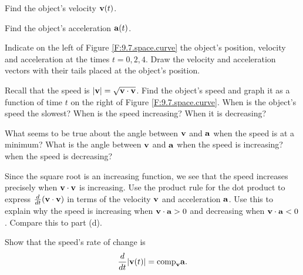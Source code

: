 \begin{activity}
\ba
\item Find the object's velocity $\mathbf{v}(t)$.

\item Find the object's acceleration $\mathbf{a}(t)$.

\item Indicate on the left of Figure \ref{F:9.7.space.curve} the object's
  position, velocity and acceleration at the times $t=0, 2, 4$.  Draw
  the velocity and acceleration vectors with their tails placed at the
  object's position.

\item Recall that the speed is $|\mathbf{v}| = \sqrt{\mathbf{v}\cdot\mathbf{v}}$. Find the object's speed and graph it as a function of time $t$ on the right of Figure \ref{F:9.7.space.curve}.  When is the
  object's speed the slowest?  When is the speed increasing?  When it
  is decreasing?

\item What seems to be true about the angle between $\mathbf{v}$ and $\mathbf{a}$ when the speed
  is at a minimum?  What is the angle between $\mathbf{v}$ and $\mathbf{a}$
  when the speed is increasing?  when the speed is decreasing?

\item   Since the square root is an increasing function, we see that the speed
  increases precisely when $\mathbf{v}\cdot\mathbf{v}$ is increasing.  Use the
  product rule for the dot product to express
  $\frac{d}{dt}(\mathbf{v}\cdot\mathbf{v})$ in terms of the velocity $\mathbf{v}$ and
  acceleration $\mathbf{a}$.  Use this to explain why the speed is increasing
  when $\mathbf{v}\cdot\mathbf{a} > 0$ and decreasing when
  $\mathbf{v}\cdot\mathbf{a} < 0$. Compare this to part (d). 

\item Show that the speed's rate of change is
  $$
  \frac{d}{dt}|\mathbf{v}(t)| = \text{comp}_{\mathbf{v}} \mathbf{a}.
  $$





\ea

\end{activity}
\begin{smallhint}

\end{smallhint}
\begin{bighint}

\end{bighint}
